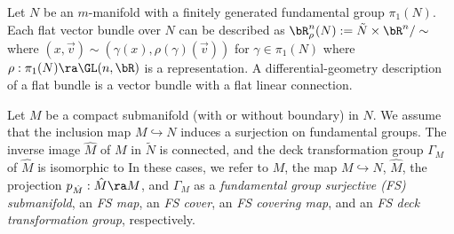 
 

Let $N$ be an $m$-manifold with a finitely generated fundamental group $\pi_1(N)$. 
Each flat vector bundle over $N$ can be described as 
$\bR^n_\rho(N):=\tilde N \times \bR^n/\sim$ where $(x, \vec{v}) \sim (\gamma(x), \rho(\gamma)(\vec{v}))$ for 
$\gamma \in \pi_1(N)$ where $\rho:\pi_1(N) \ra \GL(n, \bR)$ is a representation. 
A differential-geometry description of a flat bundle is a vector bundle with a flat linear connection. 

Let $M$ be a compact submanifold (with or without boundary) in $N$.
We assume that the inclusion map $M \hookrightarrow N$ induces a surjection on fundamental groups. The inverse image $\hat{M}$ of $M$ in $\tilde N$ is connected, and the deck transformation group $\Gamma_M$ of $\hat{M}$ is isomorphic to 
In these cases, we refer to $M$, the map $M \hookrightarrow N$, $\hat{M}$, the projection $p_{\hat{M}}: \hat{M} \ra M$, and $\Gamma_M$ as a \emph{fundamental group surjective {\rm (}FS\/{\rm }) submanifold}, an \emph{FS map}, an \emph{FS cover}, an \emph{FS covering map}, and an \emph{FS deck transformation group}, respectively.

